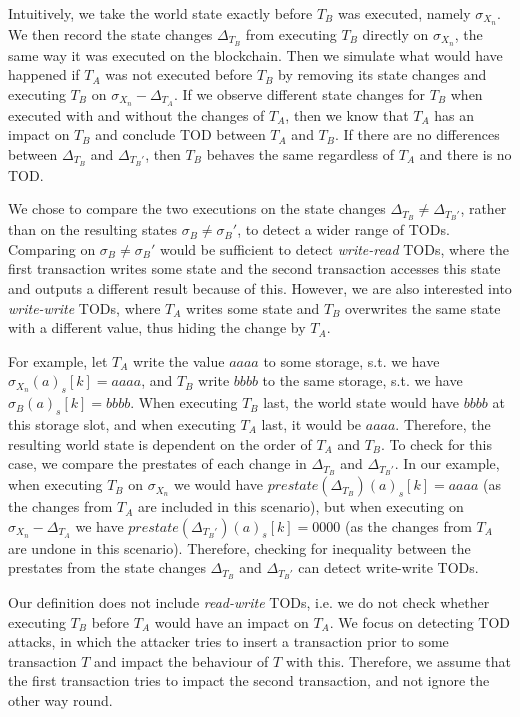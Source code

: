 \documentclass[draft,final]{vutinfth} %
\begin{document}
Intuitively, we take the world state exactly before $T_B$ was executed, namely $\sigma_{X_n}$. We then record the state changes $\Delta_{T_B}$ from executing $T_B$ directly on $\sigma_{X_n}$, the same way it was executed on the blockchain. Then we simulate what would have happened if $T_A$ was not executed before $T_B$ by removing its state changes and executing $T_B$ on $\sigma_{X_n} - \Delta_{T_A}$. If we observe different state changes for $T_B$ when executed with and without the changes of $T_A$, then we know that $T_A$ has an impact on $T_B$ and conclude TOD between $T_A$ and $T_B$. If there are no differences between $\Delta_{T_B}$ and $\Delta_{T_B\prime}$, then $T_B$ behaves the same regardless of $T_A$ and there is no TOD.

We chose to compare the two executions on the state changes $\Delta_{T_B} \neq \Delta_{T_B\prime}$, rather than on the resulting states $\sigma_B \neq \sigma_B\prime$, to detect a wider range of TODs. Comparing on $\sigma_B \neq \sigma_B\prime$ would be sufficient to detect \emph{write-read} TODs, where the first transaction writes some state and the second transaction accesses this state and outputs a different result because of this. However, we are also interested into \emph{write-write} TODs, where $T_A$ writes some state and $T_B$ overwrites the same state with a different value, thus hiding the change by $T_A$.

For example, let $T_A$ write the value $aaaa$ to some storage, s.t. we have $\sigma_{X_n}(a)_s[k] = aaaa$, and $T_B$ write $bbbb$ to the same storage, s.t. we have $\sigma_B(a)_s[k] = bbbb$. When executing $T_B$ last, the world state would have $bbbb$ at this storage slot, and when executing $T_A$ last, it would be $aaaa$. Therefore, the resulting world state is dependent on the order of $T_A$ and $T_B$. To check for this case, we compare the prestates of each change in $\Delta_{T_B}$ and $\Delta_{T_B\prime}$. In our example, when executing $T_B$ on $\sigma_{X_n}$ we would have $prestate(\Delta_{T_B})(a)_s[k] = aaaa$ (as the changes from $T_A$ are included in this scenario), but when executing on $\sigma_{X_n} - \Delta_{T_A}$ we have $prestate(\Delta_{T_B\prime})(a)_s[k] = 0000$ (as the changes from $T_A$ are undone in this scenario). Therefore, checking for inequality between the prestates from the state changes $\Delta_{T_B}$ and $\Delta_{T_B\prime}$ can detect write-write TODs.

Our definition does not include \emph{read-write} TODs, i.e. we do not check whether executing $T_B$ before $T_A$ would have an impact on $T_A$. We focus on detecting TOD attacks, in which the attacker tries to insert a transaction prior to some transaction $T$ and impact the behaviour of $T$ with this. Therefore, we assume that the first transaction tries to impact the second transaction, and not ignore the other way round.
\end{document}
